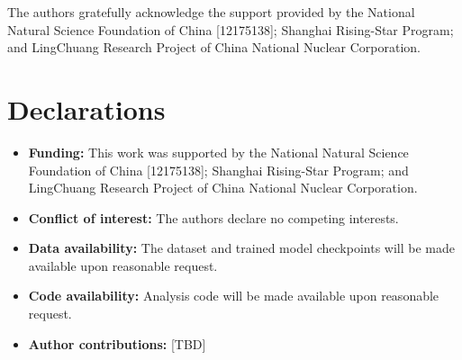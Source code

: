\documentclass[pdflatex,sn-mathphys-num]{sn-jnl}
\theoremstyle{thmstyleone}
\theoremstyle{thmstyletwo}
\theoremstyle{thmstylethree}
\begin{document}
\backmatter

The authors gratefully acknowledge the support provided by the National Natural
Science Foundation of China [12175138]; Shanghai Rising-Star Program; and
LingChuang Research Project of China National Nuclear Corporation.

\section*{Declarations}

\begin{itemize}
\item \textbf{Funding:} This work was supported by the National Natural Science
  Foundation of China [12175138]; Shanghai Rising-Star Program; and
  LingChuang Research Project of China National Nuclear Corporation.
\item \textbf{Conflict of interest:} The authors declare no competing interests.
\item \textbf{Data availability:} The dataset and trained model checkpoints will
  be made available upon reasonable request.
\item \textbf{Code availability:} Analysis code will be made available upon
  reasonable request.
\item \textbf{Author contributions:} [TBD]
\end{itemize}
\end{document}
